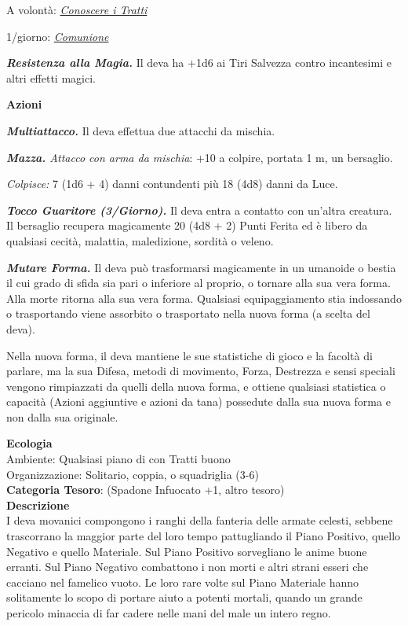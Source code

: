 \begin{multicols}{2}
{A volontà: \emph{\hyperlink{Conoscere i Tratti}{Conoscere i Tratti}}

1/giorno: \emph{\hyperlink{Comunione}{Comunione}}

\emph{\textbf{Resistenza alla Magia.}} Il deva ha +1d6 ai Tiri Salvezza contro incantesimi e altri effetti magici.

\textbf{Azioni}

\emph{\textbf{Multiattacco.}} Il deva effettua due attacchi da mischia.

\emph{\textbf{Mazza.} Attacco con arma da mischia}: +10 a colpire, portata 1 m, un bersaglio.

\emph{Colpisce:} 7 (1d6 + 4) danni contundenti più 18 (4d8) danni da Luce.

\emph{\textbf{Tocco Guaritore (3/Giorno).}} Il deva entra a contatto con un'altra creatura. Il bersaglio recupera magicamente 20 (4d8 + 2) Punti Ferita ed è libero da qualsiasi cecità, malattia, maledizione, sordità o veleno.

\emph{\textbf{Mutare Forma.}} Il deva può trasformarsi magicamente in un umanoide o bestia il cui grado di sfida sia pari o inferiore al proprio, o tornare alla sua vera forma. Alla morte ritorna alla sua vera forma. Qualsiasi equipaggiamento stia indossando o trasportando viene assorbito o trasportato nella nuova forma (a scelta del deva).

Nella nuova forma, il deva mantiene le sue statistiche di gioco e la facoltà di parlare, ma la sua Difesa, metodi di movimento, Forza, Destrezza e sensi speciali vengono rimpiazzati da quelli della nuova forma, e ottiene qualsiasi statistica o capacità (Azioni aggiuntive e azioni da tana) possedute dalla sua nuova forma e non dalla sua originale.

\textbf{Ecologia}\\
Ambiente: Qualsiasi piano di con Tratti buono\\
Organizzazione: Solitario, coppia, o squadriglia (3-6)\\
\textbf{Categoria Tesoro}: (Spadone Infuocato +1, altro tesoro)\\
\textbf{Descrizione}\\
I deva movanici compongono i ranghi della fanteria delle armate celesti, sebbene trascorrano la maggior parte del loro tempo pattugliando il Piano Positivo, quello Negativo e quello Materiale. Sul Piano Positivo sorvegliano le anime buone erranti. Sul Piano Negativo combattono i non morti e altri strani esseri che cacciano nel famelico vuoto. Le loro rare volte sul Piano Materiale hanno solitamente lo scopo di portare aiuto a potenti mortali, quando un grande pericolo minaccia di far cadere nelle mani del male un intero regno.

}
\end{multicols}
